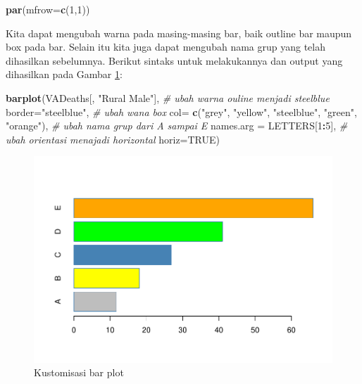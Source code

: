 \documentclass[]{book}
\newenvironment{Shaded}{\begin{snugshade}}{\end{snugshade}}
\newcommand{\KeywordTok}[1]{\textcolor[rgb]{0.13,0.29,0.53}{\textbf{#1}}}
\newcommand{\DataTypeTok}[1]{\textcolor[rgb]{0.13,0.29,0.53}{#1}}
\newcommand{\DecValTok}[1]{\textcolor[rgb]{0.00,0.00,0.81}{#1}}
\newcommand{\StringTok}[1]{\textcolor[rgb]{0.31,0.60,0.02}{#1}}
\newcommand{\CommentTok}[1]{\textcolor[rgb]{0.56,0.35,0.01}{\textit{#1}}}
\newcommand{\OtherTok}[1]{\textcolor[rgb]{0.56,0.35,0.01}{#1}}
\newcommand{\OperatorTok}[1]{\textcolor[rgb]{0.81,0.36,0.00}{\textbf{#1}}}
\newcommand{\NormalTok}[1]{#1}
\begin{document}
\begin{Shaded}
\begin{Highlighting}[]
\KeywordTok{par}\NormalTok{(}\DataTypeTok{mfrow=}\KeywordTok{c}\NormalTok{(}\DecValTok{1}\NormalTok{,}\DecValTok{1}\NormalTok{))}
\end{Highlighting}
\end{Shaded}

Kita dapat mengubah warna pada masing-masing bar, baik outline bar
maupun box pada bar. Selain itu kita juga dapat mengubah nama grup yang
telah dihasilkan sebelumnya. Berikut sintaks untuk melakukannya dan
output yang dihasilkan pada Gambar \ref{fig:barplot2}:

\begin{Shaded}
\begin{Highlighting}[]
\KeywordTok{barplot}\NormalTok{(VADeaths[, }\StringTok{"Rural Male"}\NormalTok{],}
        \CommentTok{# ubah warna ouline menjadi steelblue}
        \DataTypeTok{border=}\StringTok{"steelblue"}\NormalTok{,}
        \CommentTok{# ubah wana box}
        \DataTypeTok{col=} \KeywordTok{c}\NormalTok{(}\StringTok{"grey"}\NormalTok{, }\StringTok{"yellow"}\NormalTok{, }\StringTok{"steelblue"}\NormalTok{, }\StringTok{"green"}\NormalTok{, }\StringTok{"orange"}\NormalTok{),}
        \CommentTok{# ubah nama grup dari A sampai E}
        \DataTypeTok{names.arg =}\NormalTok{ LETTERS[}\DecValTok{1}\OperatorTok{:}\DecValTok{5}\NormalTok{],}
        \CommentTok{# ubah orientasi menajadi horizontal}
        \DataTypeTok{horiz=}\OtherTok{TRUE}\NormalTok{)}
\end{Highlighting}
\end{Shaded}

\begin{figure}

{\centering \includegraphics[width=0.7\linewidth]{EnvStat_files/figure-latex/barplot2-1} 

}

\caption{Kustomisasi bar plot}\label{fig:barplot2}
\end{figure}
\end{document}
